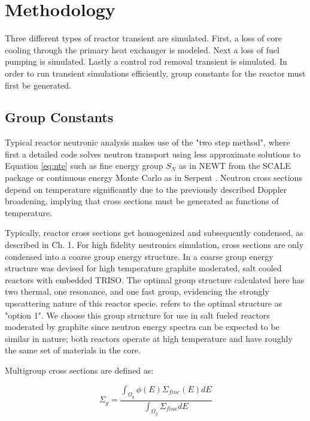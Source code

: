 \documentclass[12pt]{article}
\begin{document}
\section{Methodology}

Three different types of reactor transient are simulated. First, a loss of core cooling through the primary heat exchanger is modeled. Next a loss of fuel pumping is simulated. Lastly a control rod removal transient is simulated. In order to run transient simulations efficiently, group constants for the reactor must first be generated. 

\subsection{Group Constants}
Typical reactor neutronic analysis makes use of the "two step method", where first a detailed code solves neutron transport using less approximate solutions to Equation \ref{eq:nte} such as fine energy group $S_N$ as in NEWT from the SCALE package \cite{kim_unstructured_2011} or continuous energy Monte Carlo as in Serpent \cite{serp}. Neutron cross sections depend on temperature significantly due to the previously described Doppler broadening, implying that cross sections must be generated as functions of temperature.

Typically, reactor cross sections get homogenized and subsequently condensed, as described in \cite{stammler_methods_1983} Ch. 1. 
For high fidelity neutronics simulation, cross sections are only condensed into a coarse group energy structure. In \cite{gentry} a coarse group energy structure was devised for high temperature graphite moderated, salt cooled reactors with embedded TRISO. The optimal group structure calculated here has two thermal, one resonance, and one fast group, evidencing the strongly upscattering nature of this reactor specie. \cite{gentry} refers to the optimal structure as "option 1". We choose this group structure for use in salt fueled reactors moderated by graphite since neutron energy spectra can be expected to be similar in nature; both reactors operate at high temperature and have roughly the same set of materials in the core.

Multigroup cross sections are defined as:

\begin{equation}
\Sigma_g = \frac{\int_{\Omega_g} \phi(E) \Sigma_{fine}(E) dE}{\int_{\Omega_g} \Sigma_{fine} dE}
\end{equation}
\end{document}
